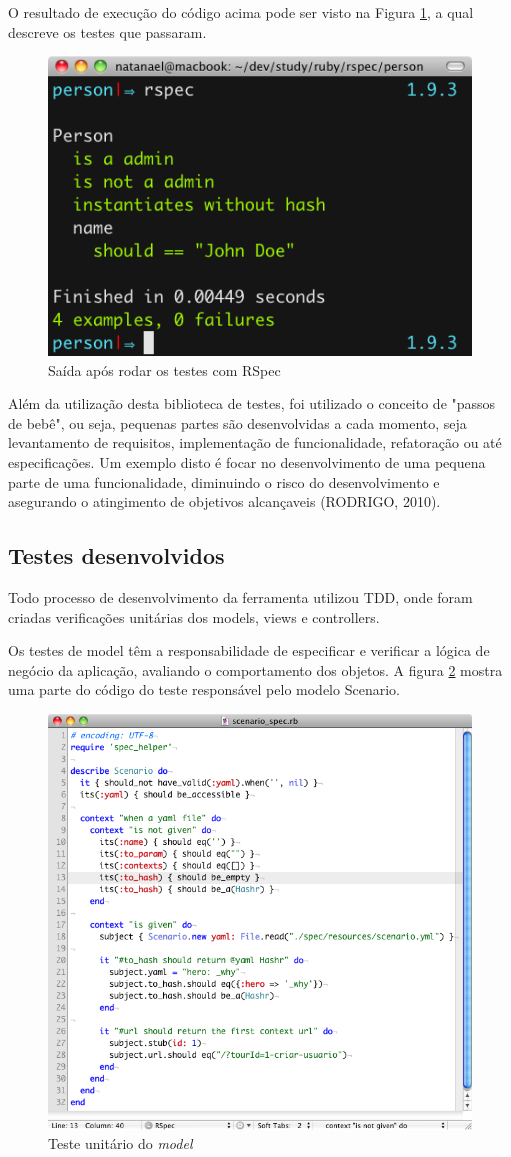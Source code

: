 O resultado de execução do código acima pode ser visto na Figura \ref{figura_32}, a qual descreve os testes que passaram.

\begin{figure}[ht]
    \centering
    \includegraphics[width=0.6 \textwidth]{figuras/figura_32}
    \caption{Saída após rodar os testes com RSpec}
    \label{figura_32}
\end{figure}

Além da utilização desta biblioteca de testes, foi utilizado o conceito de "passos de bebê", ou seja, pequenas partes são desenvolvidas a cada momento, seja levantamento de requisitos, implementação de funcionalidade, refatoração ou até especificações. Um exemplo disto é focar no desenvolvimento de uma pequena parte de uma funcionalidade, diminuindo o risco do desenvolvimento e asegurando o atingimento de objetivos alcançaveis (RODRIGO, 2010).

\subsection{Testes desenvolvidos}

Todo processo de desenvolvimento da ferramenta utilizou TDD, onde foram criadas verificações unitárias dos models, views e controllers.

Os testes de model têm a responsabilidade de especificar e verificar a lógica de negócio da aplicação, avaliando o comportamento dos objetos. A figura \ref{figura_33} mostra uma parte do código do teste responsável pelo modelo Scenario.

\begin{figure}[htpb]
    \centering
    \includegraphics[width=0.7 \textwidth]{figuras/figura_33}
    \caption{Teste unitário do \textit{model}}
    \label{figura_33}
\end{figure}

